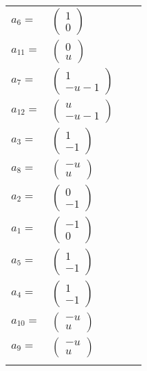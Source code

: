 \documentclass[1p]{elsarticle_modified}
\theoremstyle{definition}
\begin{document}
\begin{tabular}{m{7pt} m{180pt} m{7pt} m{180pt} }
\flushright $a_{6}=$&$\begin{pmatrix}1\\0\end{pmatrix}$ \\
\flushright $a_{11}=$&$\begin{pmatrix}0\\u\end{pmatrix}$ \\
\flushright $a_{7}=$&$\begin{pmatrix}1\\- u-1\end{pmatrix}$ \\
\flushright $a_{12}=$&$\begin{pmatrix}u\\- u-1\end{pmatrix}$ \\
\flushright $a_{3}=$&$\begin{pmatrix}1\\-1\end{pmatrix}$ \\
\flushright $a_{8}=$&$\begin{pmatrix}- u\\u\end{pmatrix}$ \\
\flushright $a_{2}=$&$\begin{pmatrix}0\\-1\end{pmatrix}$ \\
\flushright $a_{1}=$&$\begin{pmatrix}-1\\0\end{pmatrix}$ \\
\flushright $a_{5}=$&$\begin{pmatrix}1\\-1\end{pmatrix}$ \\
\flushright $a_{4}=$&$\begin{pmatrix}1\\-1\end{pmatrix}$ \\
\flushright $a_{10}=$&$\begin{pmatrix}- u\\u\end{pmatrix}$ \\
\flushright $a_{9}=$&$\begin{pmatrix}- u\\u\end{pmatrix}$\\&\end{tabular}
\end{document}
